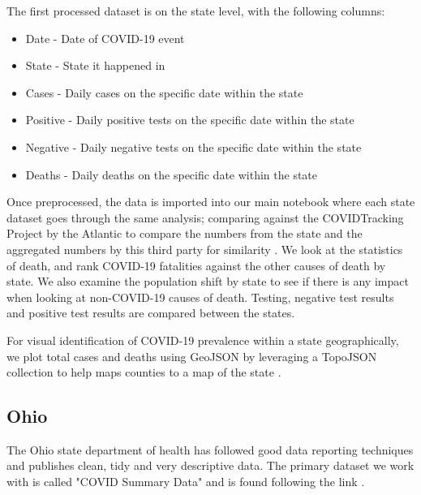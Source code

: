 \documentclass[conference]{IEEEtran}
\begin{document}
The first processed dataset is on the state level, with the following columns:
\begin{itemize}
  \item Date - Date of COVID-19 event
  \item State - State it happened in
  \item Cases - Daily cases on the specific date within the state
  \item Positive - Daily positive tests on the specific date within the state
  \item Negative - Daily negative tests on the specific date within the state
  \item Deaths - Daily deaths on the specific date within the state
\end{itemize}

Once preprocessed, the data is imported into our main notebook where each state dataset goes through the same analysis; comparing against the COVIDTracking Project by the Atlantic to compare the numbers from the state and the aggregated numbers by this third party for similarity \cite{covid19tracking_covid_nodate}.
We look at the statistics of death, and rank COVID-19 fatalities against the other causes of death by state.
We also examine the population shift by state to see if there is any impact when looking at non-COVID-19 causes of death.
Testing, negative test results and positive test results are compared between the states.

For visual identification of COVID-19 prevalence within a state geographically, we plot total cases and deaths using GeoJSON by leveraging a TopoJSON collection to help maps counties to a map of the state \cite{eldersveld_topojson_nodate}.

\subsection{Ohio}
\label{Ohio}

The Ohio state department of health has followed good data reporting techniques and publishes clean, tidy and very descriptive data. The primary dataset we work with is called "COVID Summary Data" and is found following the link \cite{system_covid-19_nodate}.
\end{document}
